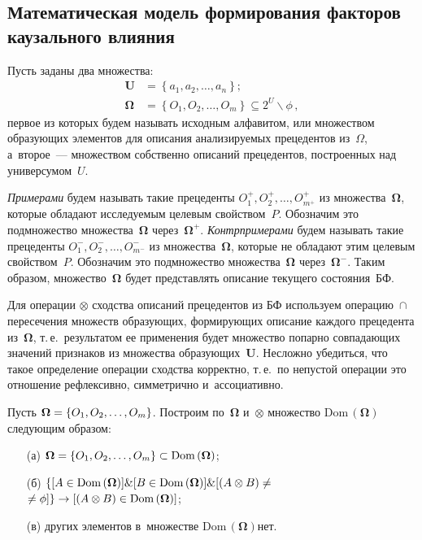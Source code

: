 \begin{multicols}{2}
  \section{Математическая модель формирования факторов каузального 
влияния}
   
  Пусть заданы два множества:
  \begin{align*}
  \boldsymbol{U}&= \left\{a_1, a_2,\ldots ,a_n\right\};\\ 
\boldsymbol{\Omega}&= \left\{O_1, O_2,\ldots , O_m\right\}\subseteq 
2^U\backslash\phi\,,
\end{align*}
 первое из которых будем называть исходным алфавитом, или 
множеством образующих элементов для описания анализируемых прецедентов 
из~$\Omega$, а~второе~--- множеством собственно описаний прецедентов, 
построенных над универсумом~$U$. 
  
  \textit{Примерами} будем называть такие прецеденты $O_1^+, O_2^+,\ldots , 
O^+_{m^+}$ из множества~$\boldsymbol{\Omega}$, которые обладают 
исследуемым целевым свойством~$P$. Обозначим это подмножество 
множества~$\boldsymbol{\Omega}$ через~$\boldsymbol{\Omega}^+$. 
\textit{Контрпримерами} будем называть такие прецеденты $O_1^-, O_2^-, \ldots , 
O^-_{m^-}$ из множества~$\boldsymbol{\Omega}$, которые не обладают этим 
целевым свойством~$P$. Обозначим это подмножество 
множества~$\boldsymbol{\Omega}$ через~$\boldsymbol{\Omega}^-$. Таким 
образом, множество~$\boldsymbol{\Omega}$ будет представлять описание 
текущего состояния~БФ. 
  
  Для операции $\otimes$ сходства описаний прецедентов из БФ используем 
операцию~$\cap$ пересечения множеств образующих, формирующих описание 
каждого прецедента из~$\boldsymbol{\Omega}$, т.\,е.\ результатом ее применения 
будет множество попарно совпадающих значений признаков из множества 
образующих~$\boldsymbol{U}$. Несложно убедиться, что такое определение 
операции сходства корректно, т.\,е.\ по непустой операции это отношение 
рефлексивно, симметрично и~ассоциативно. 
  
  Пусть $\boldsymbol{\Omega}\hm = \{O_1, O_2, \ldots , O_m\}$. Построим 
по~$\boldsymbol{\Omega}$ и~$\otimes$ множество $\mathrm{Dom}\,(\boldsymbol{\Omega})$ 
следующим образом: 
  \begin{itemize}
\item[(а)] $\boldsymbol{\Omega} \hm= \left\{ O_1, O_2, \ldots , 
O_m\right\}\hm\subset \mathrm{Dom}\,(\boldsymbol{\Omega})$;
\item[(б)] $\{ [A\in \mathrm{Dom}\,(\boldsymbol{\Omega})] \& [B\hm\in 
\mathrm{Dom}\,(\boldsymbol{\Omega})] \& [(A \otimes B) \hm\not=$\linebreak $\not= \phi]\}\to [ (A\otimes  
B)\hm\in \mathrm{Dom}\,(\boldsymbol{\Omega})]$;
\item[(в)] других элементов в~множестве $\mathrm{Dom}\,(\boldsymbol{\Omega})$нет.
\end{itemize}
  

\end{multicols}
